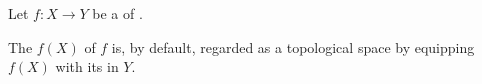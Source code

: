\begin{definition} \label{definition:image_of_continuous_map_of_topological_spaces_as_topological_space}
    Let $f: X \to Y$ be a  of .    

    The  $f(X)$ of $f$ is, by default, regarded as a topological space by equipping $f(X)$ with its  in $Y$.
\end{definition}